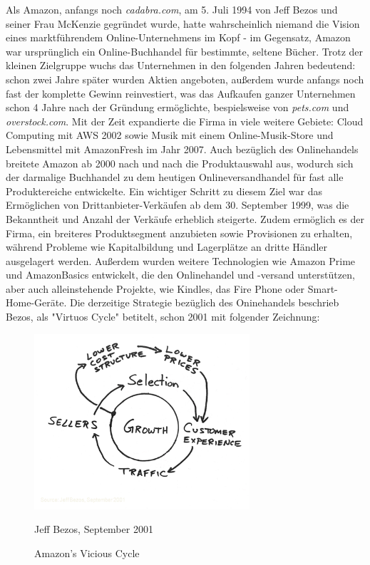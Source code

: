 Als Amazon, anfangs noch \emph{cadabra.com}, am 5. Juli 1994 von Jeff Bezos und seiner Frau McKenzie gegründet wurde, hatte wahrscheinlich niemand die Vision eines marktführendem Online-Unternehmens im Kopf - im Gegensatz, Amazon war ursprünglich ein Online-Buchhandel für bestimmte, seltene Bücher\cite[S. 17]{Graf}. Trotz der kleinen Zielgruppe wuchs das Unternehmen in den folgenden Jahren bedeutend: schon zwei Jahre später wurden Aktien angeboten, außerdem wurde anfangs noch fast der komplette Gewinn reinvestiert\cite{Rosoff}, was das Aufkaufen ganzer Unternehmen schon 4 Jahre nach der Gründung ermöglichte, bespielsweise von \emph{pets.com} und \emph{overstock.com}\cite{ChannelAdvisor}. Mit der Zeit expandierte die Firma in viele weitere Gebiete: Cloud Computing mit \ac{AWS} 2002 sowie Musik mit einem Online-Musik-Store und Lebensmittel mit AmazonFresh im Jahr 2007\cite{Sherman, ChannelAdvisor}. Auch bezüglich des Onlinehandels breitete Amazon ab 2000 nach und nach die Produktauswahl aus, wodurch sich der darmalige Buchhandel zu dem heutigen Onlineversandhandel für fast alle Produktereiche entwickelte. Ein wichtiger Schritt zu diesem Ziel war das Ermöglichen von Drittanbieter-Verkäufen ab dem 30. September 1999, was die Bekanntheit und Anzahl der Verkäufe erheblich steigerte\cite{Sherman}. Zudem ermöglich es der Firma, ein breiteres Produktsegment anzubieten sowie Provisionen zu erhalten, während Probleme wie Kapitalbildung und Lagerplätze an dritte Händler ausgelagert werden\cite[S. 50]{evilcom}. Außerdem wurden weitere Technologien wie Amazon Prime und AmazonBasics entwickelt, die den Onlinehandel und -versand unterstützen\cite{ChannelAdvisor}, aber auch alleinstehende Projekte, wie Kindles, das Fire Phone oder Smart-Home-Geräte\cite{Sherman}.
Die derzeitige Strategie bezüglich des Oninehandels beschrieb Bezos, als "Virtuos Cycle" betitelt, schon 2001  mit folgender Zeichnung\cite{zentail}:


\begin{figure}[h]
    \begin{center}
        \includegraphics[width=8cm]{media/Fabian-vicious-cycle.png}
        \caption{Amazon's Vicious Cycle}
        \label{vicious-cycle}
        \bildquelle Jeff Bezos, September 2001 %
    \end{center}
\end{figure} 

